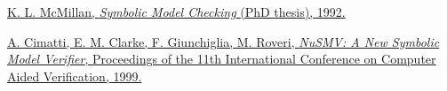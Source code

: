 \documentclass[12pt,a4paper,twoside]{article}
\begin{document}
\begin{thebibliography}{9}
	
	\href{http://www.kenmcmil.com/pubs/thesis.pdf}{
		K. L. McMillan,
		\emph{Symbolic Model Checking} (PhD thesis),
		1992.
	}
	
	\href{http://nusmv.fbk.eu/NuSMV/papers/cav99/html/index.html}{
		A. Cimatti, E. M. Clarke, F. Giunchiglia, M. Roveri,
		\emph{NuSMV: A New Symbolic Model Verifier},
		Proceedings of the 11th International Conference on Computer Aided Verification,
		1999.
	}
\end{thebibliography}
\end{document}

